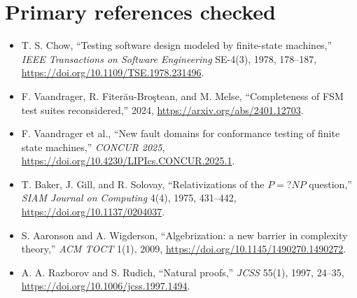 \documentclass[11pt]{article}
\begin{document}
\section*{Primary references checked}
\begin{itemize}
\item T. S. Chow, ``Testing software design modeled by finite-state
machines,'' \emph{IEEE Transactions on Software Engineering} SE-4(3), 1978,
178--187, \url{https://doi.org/10.1109/TSE.1978.231496}.
\item F. Vaandrager, R. Fiter\u{a}u-Bro\c{s}tean, and M. Melse,
``Completeness of FSM test suites reconsidered,'' 2024,
\url{https://arxiv.org/abs/2401.12703}.
\item F. Vaandrager et al., ``New fault domains for conformance testing of
finite state machines,'' \emph{CONCUR 2025},
\url{https://doi.org/10.4230/LIPIcs.CONCUR.2025.1}.
\item T. Baker, J. Gill, and R. Solovay, ``Relativizations of the
\(P=?NP\) question,'' \emph{SIAM Journal on Computing} 4(4), 1975,
431--442, \url{https://doi.org/10.1137/0204037}.
\item S. Aaronson and A. Wigderson, ``Algebrization: a new barrier in
complexity theory,'' \emph{ACM TOCT} 1(1), 2009,
\url{https://doi.org/10.1145/1490270.1490272}.
\item A. A. Razborov and S. Rudich, ``Natural proofs,'' \emph{JCSS} 55(1),
1997, 24--35, \url{https://doi.org/10.1006/jcss.1997.1494}.
\end{itemize}

\end{document}
